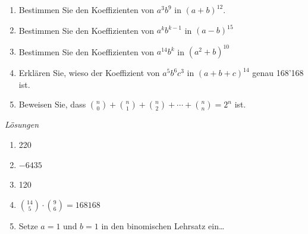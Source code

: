 \clearpage
\begin{ueb}
    {}{}
    \begin{enumerate}
        \item Bestimmen Sie den Koeffizienten von \(a^3b^9\) in \((a+b)^{12}\).
        \item Bestimmen Sie den Koeffizienten von \(a^k b^{k-1}\) in \((a-b)^{15}\)
        \item Bestimmen Sie den Koeffizienten von \(a^{14} b^{k}\) in \((a^2+b)^{10}\)
        \item Erklären Sie, wieso der Koeffizient von \(a^5 b^6 c^3\) in \((a+b+c)^{14}\) genau 168'168 ist.
        \item Beweisen Sie, dass \(\binom{n}{0} + \binom{n}{1} + \binom{n}{2} + \cdots + \binom{n}{n} = 2^n\) ist.
    \end{enumerate}

\end{ueb}

\clearpage
\emph{Lösungen}
\begin{enumerate}
    \item 220
    \item \(-6435\)
    \item 120
    \item \(\binom{14}{5}\cdot \binom{9}{6} = 168168\)
    \item Setze \(a=1\) und \(b=1\) in den binomischen Lehrsatz ein\dots
\end{enumerate}







